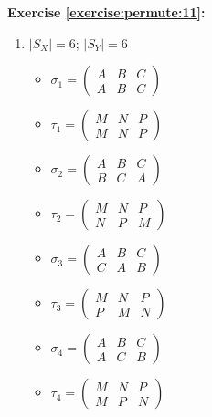 \noindent\textbf{Exercise \ref{exercise:permute:11}:} %
\begin{enumerate}[{a.}]
\item
$|S_X| = 6$; $|S_Y| = 6$\\
	\begin{multicols}{2}
	\begin{itemize}
	\item
	$\sigma_1 = \begin{pmatrix}
	A & B & C\\
	A & B & C
	\end{pmatrix}$

	\item
	$\tau_1 = \begin{pmatrix}
	M & N & P\\
	M & N & P
	\end{pmatrix}$

	\item
	$\sigma_2 = \begin{pmatrix}
	A & B & C\\
	B & C & A
	\end{pmatrix}$

	\item
	$\tau_2 = \begin{pmatrix}
	M & N & P\\
	N & P & M
	\end{pmatrix}$
	
	\item
	$\sigma_3 = \begin{pmatrix}
	A & B & C\\
	C & A & B
	\end{pmatrix}$

	\item
	$\tau_3 = \begin{pmatrix}
	M & N & P\\
	P & M & N
	\end{pmatrix}$\\

	\item
	$\sigma_4 = \begin{pmatrix}
	A & B & C\\
	A & C & B
	\end{pmatrix}$

	\item
	$\tau_4 = \begin{pmatrix}
	M & N & P\\
	M & P & N
	\end{pmatrix}$\\


\end{itemize}
\end{multicols}
\end{enumerate}
